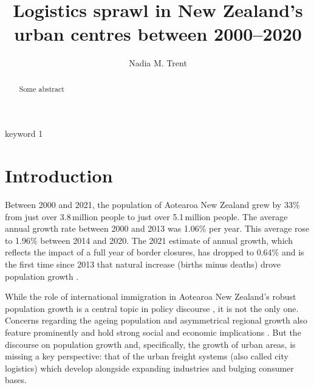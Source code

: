 \documentclass[3p, a4paper, authoryear, 11pt, fleqn, review]{elsarticle}
\title{Logistics sprawl in New Zealand's urban centres between 2000--2020}
\author[UW]{Nadia M. Trent\fnref{ead1}}
\newcommand{\nmt}[1]{{\color{ForestGreen}{~(nmt: #1)}}}
\begin{document}




\begin{abstract}\small
Some abstract
\end{abstract}

\begin{keyword}
keyword 1
\end{keyword}


\maketitle


\section{Introduction}
\label{sec:Intro}

\nmt{NADIA: Is city logistics really the right term to use here? I don't see a firm home for logistics sprawl research under the city logistics umbrella}
\nmt{Common ground} Between 2000 and 2021, the population of Aotearoa New Zealand grew by 33\% from just over 3.8\,million people to just over 5.1\,million people. The average annual growth rate between 2000 and 2013 was 1.06\% per year. This average rose to 1.96\% between 2014 and 2020. The 2021 estimate of annual growth, which reflects the impact of a full year of border closures, has dropped to 0.64\% \nmt{ref StatsNZ} and is the first time since 2013 that natural increase (births minus deaths) drove population growth \nmt{https://www.stats.govt.nz/news/births-drive-population-growth}.  

While the role of international immigration in Aotearoa New Zealand's robust population growth is a central topic in policy discourse \nmt{Book chapter}, it is not the only one. Concerns regarding the ageing population and asymmetrical regional growth also feature prominently and hold strong social and economic implications \nmt{Michael Cameron?, Brabyn and Jackson}. \nmt{Complication} But the discourse on population growth and, specifically, the growth of urban areas, is missing a key perspective: that of the urban freight systems (also called city logistics) which develop alongside expanding industries and bulging consumer bases.
\end{document}
